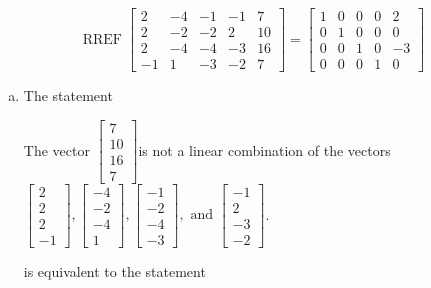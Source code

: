 \begin{exerciseAnswer} 
\[\operatorname{RREF}  \left[\begin{array}{cccc|c}
2 & -4 & -1 & -1 & 7 \\
2 & -2 & -2 & 2 & 10 \\
2 & -4 & -4 & -3 & 16 \\
-1 & 1 & -3 & -2 & 7
\end{array}\right] = \left[\begin{array}{cccc|c}
1 & 0 & 0 & 0 & 2 \\
0 & 1 & 0 & 0 & 0 \\
0 & 0 & 1 & 0 & -3 \\
0 & 0 & 0 & 1 & 0
\end{array}\right] \]
\begin{enumerate}[(a)]
\item  The statement 
\begin{center}\begin{minipage}{0.8\textwidth}
 The vector \( \left[\begin{array}{c}
7 \\
10 \\
16 \\
7
\end{array}\right] \)is not a linear combination of the vectors \( \left[\begin{array}{c}
2 \\
2 \\
2 \\
-1
\end{array}\right] , \left[\begin{array}{c}
-4 \\
-2 \\
-4 \\
1
\end{array}\right] , \left[\begin{array}{c}
-1 \\
-2 \\
-4 \\
-3
\end{array}\right] , \text{ and } \left[\begin{array}{c}
-1 \\
2 \\
-3 \\
-2
\end{array}\right] \). 
\end{minipage}\end{center}
     is equivalent to the statement 
\begin{center}\begin{minipage}{0.8\textwidth}

\end{minipage}
\end{center}
\end{enumerate}
\end{exerciseAnswer}
